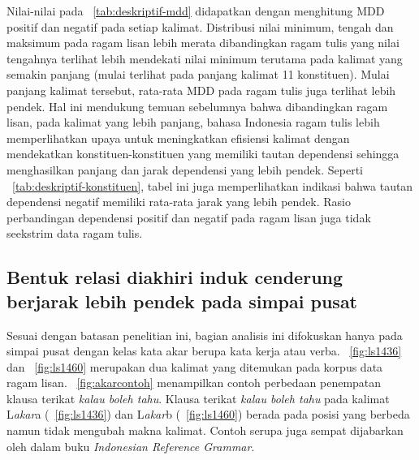 Nilai-nilai pada \tab~\ref{tab:deskriptif-mdd} didapatkan dengan menghitung MDD positif dan negatif pada setiap kalimat. Distribusi nilai minimum, tengah dan maksimum pada ragam lisan lebih merata dibandingkan ragam tulis yang nilai tengahnya terlihat lebih mendekati nilai minimum terutama pada kalimat yang semakin panjang (mulai terlihat pada panjang kalimat 11 konstituen). Mulai panjang kalimat tersebut, rata-rata MDD pada ragam tulis juga terlihat lebih pendek. Hal ini mendukung temuan sebelumnya bahwa dibandingkan ragam lisan, pada kalimat yang lebih panjang, bahasa Indonesia ragam tulis lebih memperlihatkan upaya untuk meningkatkan efisiensi kalimat dengan mendekatkan konstituen-konstituen yang memiliki tautan dependensi sehingga menghasilkan panjang dan jarak dependensi yang lebih pendek. Seperti \tab~\ref{tab:deskriptif-konstituen}, tabel ini juga memperlihatkan indikasi bahwa tautan dependensi negatif memiliki rata-rata jarak yang lebih pendek. Rasio perbandingan dependensi positif dan negatif pada ragam lisan juga tidak seekstrim data ragam tulis. 

\subsection{Bentuk relasi diakhiri induk cenderung berjarak lebih pendek pada simpai pusat}
Sesuai dengan batasan penelitian ini, bagian analisis ini difokuskan hanya pada simpai pusat dengan kelas kata akar berupa kata kerja atau verba. \pic~\ref{fig:ls1436} dan \pic~\ref{fig:ls1460} merupakan dua kalimat yang ditemukan pada korpus data ragam lisan. \pic~\ref{fig:akarcontoh} menampilkan contoh perbedaan penempatan klausa terikat \textit{kalau boleh tahu}. Klausa terikat \textit{kalau boleh tahu} pada kalimat L\textit{akar}a (\pic~\ref{fig:ls1436}) dan L\textit{akar}b (\pic~\ref{fig:ls1460}) berada pada posisi yang berbeda namun tidak mengubah makna kalimat. Contoh serupa juga sempat dijabarkan oleh \citet[p. 209]{sneddon2010indonesian} dalam buku \textit{Indonesian Reference Grammar}.

